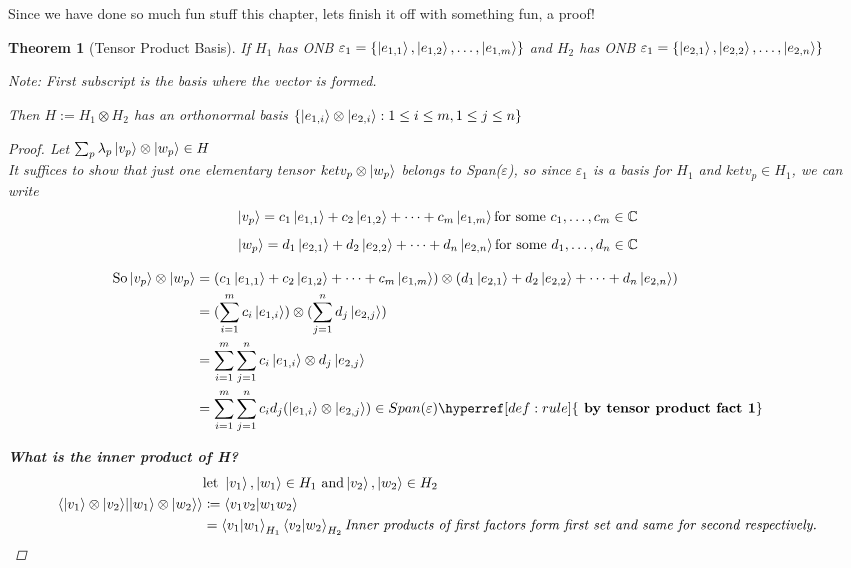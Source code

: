 \documentclass[12pt]{article}
\theoremstyle{plain}
\newtheorem{theorem}[lemma]{Theorem}
\theoremstyle{nonumberplain}
\theoremstyle{plain}
\theoremstyle{nonumberplain}
\newtheorem{proof}{Proof.}
\newcommand\1{{\bf 1}}
\newcommand{\C}{\mathbb{C}} %
\newcommand{\<}{\left\langle}
\renewcommand{\>}{\right\rangle}
\begin{document}
\pagebreak
Since we have done so much fun stuff this chapter, lets finish it off with something fun, a proof!
\begin{theorem} [Tensor Product Basis]\leavevmode\linebreak
If $H_1$ has ONB $\varepsilon_1 = \{\ket{e_{1,1}}, \ket{e_{1,2}}, \dots, \ket{e_{1,m}}\}$ and $H_2$ has ONB $\varepsilon_1 = \{\ket{e_{2,1}}, \ket{e_{2,2}}, \dots, \ket{e_{2,n}}\}$
\begin{center}
\textit{Note: First subscript is the basis where the vector is formed.}\\
\end{center}
Then $H := H_1 \otimes H_2$ has an orthonormal basis $\{\ket{e_{1,i}} \otimes \ket{e_{2,i}} : 1 \leq i \leq m, 1 \leq j \leq n \}$
\begin{proof} Let $\sum_p \lambda_p \ket{v_p} \otimes \ket{w_p} \in H$\\
It suffices to show that just one elementary tensor $ket{v_p} \otimes \ket{w_p}$ belongs to Span($\varepsilon$), so since $\varepsilon_1$ is a basis for $H_1$ and $ket{v_p} \in H_1$, we can write 
\begin{equation*}
\ket{v_p} = c_1\ket{e_{1,1}} + c_2\ket{e_{1,2}} + \dots + c_m\ket{e_{1,m}} \text{for some } c_1, \dots, c_m \in \C  
\end{equation*}
\begin{equation*}
\ket{w_p} = d_1\ket{e_{2,1}} + d_2\ket{e_{2,2}} + \dots + d_n\ket{e_{2,n}} \text{for some } d_1, \dots, d_n \in \C  
\end{equation*}

\begin{align*}
\text{So} \ket{v_p} \otimes \ket{w_p} &= (c_1\ket{e_{1,1}} + c_2\ket{e_{1,2}} + \dots + c_m\ket{e_{1,m}}) \otimes (d_1\ket{e_{2,1}} + d_2\ket{e_{2,2}} + \dots + d_n\ket{e_{2,n}})\\
&= (\sum_{i=1}^{m} c_i\ket{e_{1,i}}) \otimes (\sum_{j=1}^{n} d_j\ket{e_{2,j}})\\
&= \sum_{i=1}^{m}\sum_{j=1}^{n} c_i\ket{e_{1,i}} \otimes d_j\ket{e_{2,j}}\\
&= \sum_{i=1}^{m}\sum_{j=1}^{n} c_i d_j (\ket{e_{1,i}} \otimes \ket{e_{2,j}}) \in Span(\varepsilon) \hyperref[def:rule]{\textbf{ by tensor product fact 1}}\\
\end{align*}

\textbf{What is the inner product of H?}\\
\begin{align*}
&\text{let } \ket{v_1}, \ket{w_1} \in H_1 \text{ and} \ket{v_2}, \ket{w_2} \in H_2\\
\braket{{\ket{v_1} \otimes \ket{v_2}}|{\ket{w_1} \otimes \ket{w_2}}} &\coloneqq \braket{v_1v_2|w_1w_2}\\
&= \braket{v_1|w_1}_{H_1} \braket{v_2|w_2}_{H_2} \textit{Inner products of first factors form first set and same for second respectively.}
\end{align*}


\end{proof}
\end{theorem}
\end{document}
